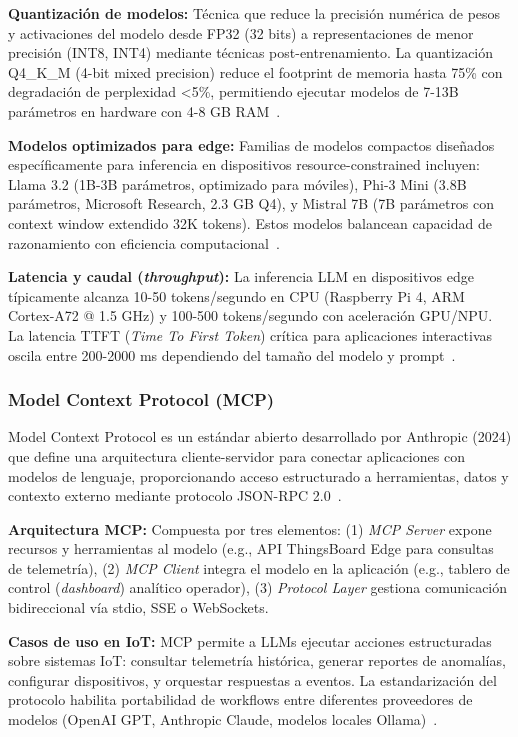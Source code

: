 \textbf{Quantización de modelos:} Técnica que reduce la precisión numérica de pesos y activaciones del modelo desde FP32 (32 bits) a representaciones de menor precisión (INT8, INT4) mediante técnicas post-entrenamiento. La quantización Q4\_K\_M (4-bit mixed precision) reduce el footprint de memoria hasta 75\% con degradación de perplexidad <5\%, permitiendo ejecutar modelos de 7-13B parámetros en hardware con 4-8 GB RAM~\cite{dettmersGPTQAccuratePost2023}.

\textbf{Modelos optimizados para edge:} Familias de modelos compactos diseñados específicamente para inferencia en dispositivos resource-constrained incluyen: Llama 3.2 (1B-3B parámetros, optimizado para móviles), Phi-3 Mini (3.8B parámetros, Microsoft Research, 2.3 GB Q4), y Mistral 7B (7B parámetros con context window extendido 32K tokens). Estos modelos balancean capacidad de razonamiento con eficiencia computacional~\cite{touvronLLaMAOpenEfficient2023,jiangMistral7B2023}.

\textbf{Latencia y caudal (\textit{throughput}):} La inferencia LLM en dispositivos edge típicamente alcanza 10-50 tokens/segundo en CPU (Raspberry Pi 4, ARM Cortex-A72 @ 1.5 GHz) y 100-500 tokens/segundo con aceleración GPU/NPU. La latencia TTFT (\textit{Time To First Token}) crítica para aplicaciones interactivas oscila entre 200-2000 ms dependiendo del tamaño del modelo y prompt~\cite{zhaoTurningAILargeScale2024}.

\subsubsection{Model Context Protocol (MCP)}
\label{sec:marco-estado-mcp}

Model Context Protocol es un estándar abierto desarrollado por Anthropic (2024) que define una arquitectura cliente-servidor para conectar aplicaciones con modelos de lenguaje, proporcionando acceso estructurado a herramientas, datos y contexto externo mediante protocolo JSON-RPC 2.0~\cite{anthropicModelContextProtocol2024}.

\textbf{Arquitectura MCP:} Compuesta por tres elementos: (1) \textit{MCP Server} expone recursos y herramientas al modelo (e.g., API ThingsBoard Edge para consultas de telemetría), (2) \textit{MCP Client} integra el modelo en la aplicación (e.g., tablero de control (\textit{dashboard}) analítico operador), (3) \textit{Protocol Layer} gestiona comunicación bidireccional vía stdio, SSE o WebSockets.

\textbf{Casos de uso en IoT:} MCP permite a LLMs ejecutar acciones estructuradas sobre sistemas IoT: consultar telemetría histórica, generar reportes de anomalías, configurar dispositivos, y orquestar respuestas a eventos. La estandarización del protocolo habilita portabilidad de workflows entre diferentes proveedores de modelos (OpenAI GPT, Anthropic Claude, modelos locales Ollama)~\cite{anthropicModelContextProtocol2024}.

